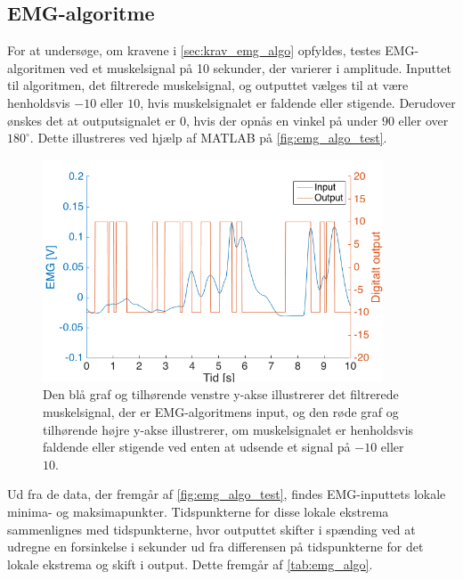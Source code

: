 \subsection{EMG-algoritme}
For at undersøge, om kravene i \autoref{sec:krav_emg_algo} opfyldes, testes EMG-algoritmen ved et muskelsignal på 10 sekunder, der varierer i amplitude. Inputtet til algoritmen, det filtrerede muskelsignal, og outputtet vælges til at være henholdsvis $-10$ eller $10$, hvis muskelsignalet er faldende eller stigende. Derudover ønskes det at outputsignalet er 0, hvis der opnås en vinkel på under $90$ eller over $180^{\circ}$. Dette illustreres ved hjælp af MATLAB på \autoref{fig:emg_algo_test}. 

\begin{figure}[H]
\centering
\includegraphics[width=0.9\textwidth]{figures/EMG_algo_test}
\caption{Den blå graf og tilhørende venstre y-akse illustrerer det filtrerede muskelsignal, der er EMG-algoritmens input, og den røde graf og tilhørende højre y-akse illustrerer, om muskelsignalet er henholdsvis faldende eller stigende ved enten at udsende et signal på $-10$ eller $10$.}
\label{fig:emg_algo_test}
\end{figure}

\noindent
Ud fra de data, der fremgår af \autoref{fig:emg_algo_test}, findes EMG-inputtets lokale minima- og maksimapunkter. Tidspunkterne for disse lokale ekstrema sammenlignes med tidspunkterne, hvor outputtet skifter i spænding ved at udregne en forsinkelse i sekunder ud fra differensen på tidspunkterne for det lokale ekstrema og skift i output. Dette fremgår af \autoref{tab:emg_algo}. 

